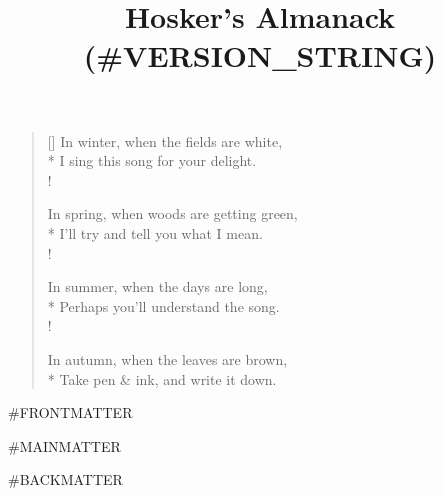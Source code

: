 \documentclass{amsbook}
\title{Hosker's Almanack (#VERSION_STRING)}
\begin{document}
\frontmatter

\maketitle

\settowidth{\versewidth}{In winter, when the fields are white,}
\begin{verse}[\versewidth]
    In winter, when the fields are white,\\*
    I sing this song for your delight.\\!

    In spring, when woods are getting green,\\*
    I'll try and tell you what I mean.\\!

    In summer, when the days are long,\\*
    Perhaps you'll understand the song.\\!

    In autumn, when the leaves are brown,\\*
    Take pen \& ink, and write it down.
\end{verse}

\tableofcontents

#FRONTMATTER

\renewcommand\chaptername{Month}

\mainmatter

\makeatletter
    \newcommand*{\articlesymbolsingle}[1]{\ensuremath{%
        \ifcase#1%
            \or \ddagger%
            \or \dagger%
            \or *%
            \or \mathsection%
            \or \mathparagraph%
            \else \@ctrerr%
        \fi%
    }}
    \newcommand*{\articlesymbol}[1]{\articlesymbolsingle{\value{#1}}}
\makeatother

\renewcommand\thefootnote{\textbf{\thesubsection} $\cdot$}
\makeatletter
    \def\blfootnote{\xdef\@thefnmark{}\@footnotetext}
    \renewcommand{\@makefnmark}{\hbox{\@thefnmark}\hbox{}}
    \renewcommand\@makefntext[1]{\hspace*{1em}{\@thefnmark} #1}
\makeatother

\pagestyle{fancy}
\fancyhf{}
\fancyhead{}
\fancyhead[LE, RO]{\thepage}
\fancyhead[CO]{\footnotesize{\textsc{{\chaptername} {\thechapter}}}}

#MAINMATTER


\renewcommand\thefootnote{\arabic{footnote}}
\makeatletter
    \renewcommand{\@makefnmark}{\textsuperscript{\@thefnmark}}
    \renewcommand\@makefntext[1]{\hspace*{1em}\textsuperscript{\@thefnmark}#1}
\makeatother

#BACKMATTER

\printbibliography[title={Sources}]
\end{document}
